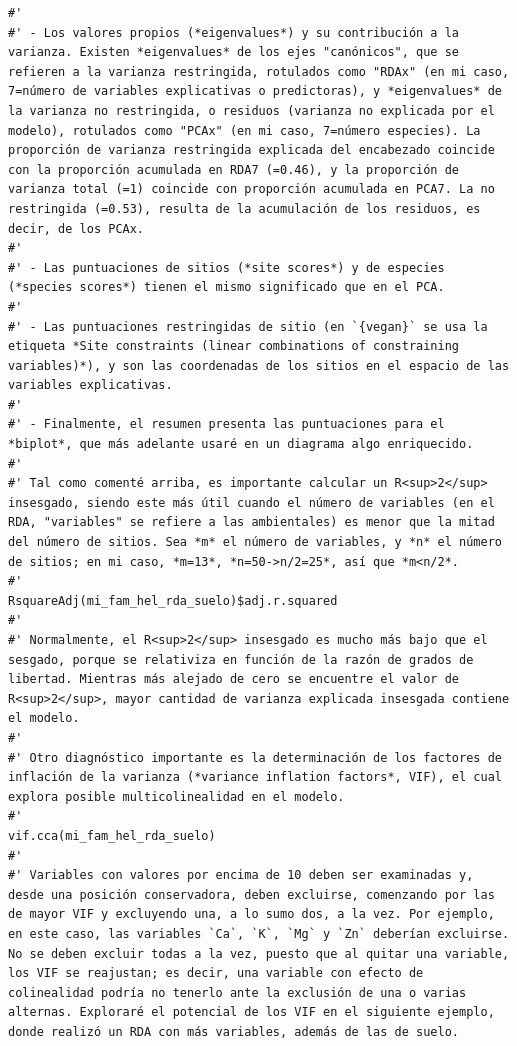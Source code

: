 \documentclass[11pt,]{article}
\begin{document}
\begin{verbatim}
#' 
#' - Los valores propios (*eigenvalues*) y su contribución a la varianza. Existen *eigenvalues* de los ejes "canónicos", que se refieren a la varianza restringida, rotulados como "RDAx" (en mi caso, 7=número de variables explicativas o predictoras), y *eigenvalues* de la varianza no restringida, o residuos (varianza no explicada por el modelo), rotulados como "PCAx" (en mi caso, 7=número especies). La proporción de varianza restringida explicada del encabezado coincide con la proporción acumulada en RDA7 (=0.46), y la proporción de varianza total (=1) coincide con proporción acumulada en PCA7. La no restringida (=0.53), resulta de la acumulación de los residuos, es decir, de los PCAx.
#' 
#' - Las puntuaciones de sitios (*site scores*) y de especies (*species scores*) tienen el mismo significado que en el PCA.
#' 
#' - Las puntuaciones restringidas de sitio (en `{vegan}` se usa la etiqueta *Site constraints (linear combinations of constraining variables)*), y son las coordenadas de los sitios en el espacio de las variables explicativas.
#' 
#' - Finalmente, el resumen presenta las puntuaciones para el *biplot*, que más adelante usaré en un diagrama algo enriquecido.
#' 
#' Tal como comenté arriba, es importante calcular un R<sup>2</sup> insesgado, siendo este más útil cuando el número de variables (en el RDA, "variables" se refiere a las ambientales) es menor que la mitad del número de sitios. Sea *m* el número de variables, y *n* el número de sitios; en mi caso, *m=13*, *n=50->n/2=25*, así que *m<n/2*.
#' 
RsquareAdj(mi_fam_hel_rda_suelo)$adj.r.squared
#' 
#' Normalmente, el R<sup>2</sup> insesgado es mucho más bajo que el sesgado, porque se relativiza en función de la razón de grados de libertad. Mientras más alejado de cero se encuentre el valor de R<sup>2</sup>, mayor cantidad de varianza explicada insesgada contiene el modelo.
#' 
#' Otro diagnóstico importante es la determinación de los factores de inflación de la varianza (*variance inflation factors*, VIF), el cual explora posible multicolinealidad en el modelo.
#' 
vif.cca(mi_fam_hel_rda_suelo)
#' 
#' Variables con valores por encima de 10 deben ser examinadas y, desde una posición conservadora, deben excluirse, comenzando por las de mayor VIF y excluyendo una, a lo sumo dos, a la vez. Por ejemplo, en este caso, las variables `Ca`, `K`, `Mg` y `Zn` deberían excluirse. No se deben excluir todas a la vez, puesto que al quitar una variable, los VIF se reajustan; es decir, una variable con efecto de colinealidad podría no tenerlo ante la exclusión de una o varias alternas. Exploraré el potencial de los VIF en el siguiente ejemplo, donde realizó un RDA con más variables, además de las de suelo.

\end{verbatim}
\end{document}
